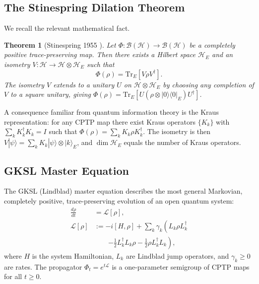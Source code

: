 \documentclass[11pt,twocolumn]{article}
\newtheorem{theorem}{Theorem}[section]
\theoremstyle{remark}
\begin{document}
\subsection{The Stinespring Dilation Theorem}

We recall the relevant mathematical fact.

\begin{theorem}[Stinespring 1955 \cite{Stinespring1955}]
Let $\Phi: \mathcal{B}(\mathcal{H}) \to \mathcal{B}(\mathcal{H})$ be a
completely positive trace-preserving map. Then there exists a Hilbert
space $\mathcal{H}_E$ and an isometry $V: \mathcal{H} \to \mathcal{H}
\otimes \mathcal{H}_E$ such that
\[
  \Phi(\rho) = \mathrm{Tr}_E\!\left[V\rho V^\dagger\right].
\]
The isometry $V$ extends to a unitary $U$ on $\mathcal{H}\otimes
\mathcal{H}_E$ by choosing any completion of $V$ to a square unitary,
giving $\Phi(\rho) = \mathrm{Tr}_E[U(\rho\otimes|0\rangle\langle
0|_E)U^\dagger]$.
\end{theorem}

A consequence familiar from quantum information theory
\cite{Nielsen2000} is the Kraus representation: for any CPTP map
there exist Kraus operators $\{K_k\}$ with $\sum_k K_k^\dagger K_k = I$
such that $\Phi(\rho) = \sum_k K_k \rho K_k^\dagger$. The isometry
is then $V|\psi\rangle = \sum_k K_k|\psi\rangle \otimes |k\rangle_E$,
and $\dim\mathcal{H}_E$ equals the number of Kraus operators.

\subsection{GKSL Master Equation}

The GKSL (Lindblad) master equation \cite{Gorini1976,Lindblad1976}
describes the most general Markovian, completely positive, trace-preserving
evolution of an open quantum system:
\begin{align}
  \frac{d\rho}{dt} &= \mathcal{L}[\rho], \nonumber \\
  \mathcal{L}[\rho] &:= -i[H,\rho] + \sum_k \gamma_k\!\left(
    L_k \rho L_k^\dagger \right. \nonumber \\
  &\qquad \left. - \tfrac{1}{2} L_k^\dagger L_k \rho
    - \tfrac{1}{2} \rho L_k^\dagger L_k
  \right),
  \label{eq:gksl}
\end{align}
where $H$ is the system Hamiltonian, $L_k$ are Lindblad jump operators,
and $\gamma_k \geq 0$ are rates. The propagator $\Phi_t = e^{t\mathcal{L}}$
is a one-parameter semigroup of CPTP maps for all $t \geq 0$.
\end{document}
